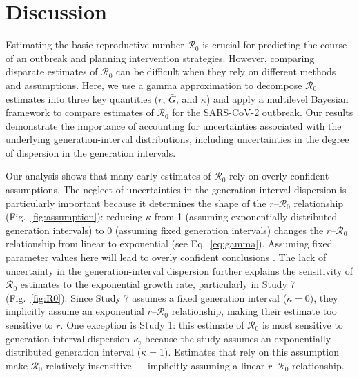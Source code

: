 \documentclass[12pt]{article}
\newcommand{\eref}[1]{Eq.~\ref{eq:#1}}
\newcommand{\fref}[1]{Fig.~\ref{fig:#1}}
\newcommand{\Ro}{\ensuremath{{\mathcal R}_{0}}\xspace}
\begin{document}
\section{Discussion}

Estimating the basic reproductive number \Ro is crucial for predicting the course of an outbreak and planning intervention strategies.
However, comparing disparate estimates of \Ro can be difficult when they rely on different methods and assumptions.
Here, we use a gamma approximation \citep{park2019practical} to decompose \Ro estimates into three key quantities ($r$, $\bar G$, and $\kappa$) and apply a multilevel Bayesian framework to compare estimates of \Ro for the SARS-CoV-2 outbreak.
Our results demonstrate the importance of accounting for uncertainties associated with the underlying generation-interval distributions, including uncertainties in the degree of dispersion in the generation intervals.

Our analysis shows that many early estimates of \Ro rely on overly confident assumptions.
The neglect of uncertainties in the generation-interval dispersion is particularly important because it determines the shape of the $r$--\Ro relationship (\fref{assumption}):
reducing $\kappa$ from 1 (assuming exponentially distributed generation intervals) to 0 (assuming fixed generation intervals) changes the $r$--\Ro relationship from linear to exponential (see \eref{gamma}).
Assuming fixed parameter values here will lead to overly confident conclusions \citep{elderd2006uncertainty}.
The lack of uncertainty in the generation-interval dispersion further explains the sensitivity of \Ro estimates to the exponential growth rate, particularly in Study 7 (\fref{R0}).
Since Study 7 assumes a fixed generation interval ($\kappa=0$), they implicitly assume an exponential $r$--\Ro relationship, making their estimate too sensitive to $r$.
One exception is Study 1: this estimate of \Ro is most sensitive to generation-interval dispersion $\kappa$,
because the study assumes an exponentially distributed generation interval ($\kappa=1$). 
Estimates that rely on this assumption make \Ro relatively insensitive --- implicitly assuming a linear $r$--\Ro relationship.
\end{document}
